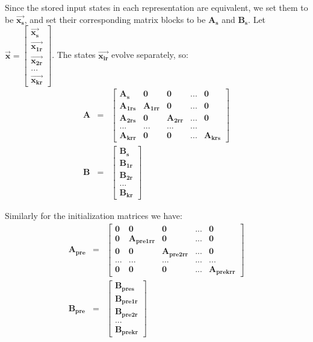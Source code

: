     Since the stored input states in each representation are
equivalent, we set them to be $\vec{\mathbf{x_s}}$, and set their
corresponding matrix blocks to be $\mathbf{A_s}$ and
$\mathbf{B_s}$. Let $\vec{\mathbf{x}} = \left [ \begin{array} {c}
\vec{\mathbf{x_{s}}} \\ \vec{\mathbf{x_{1r}}} \\
\vec{\mathbf{x_{2r}}} \\ ... \\ \vec{\mathbf{x_{kr}}} \end{array}
\right ]$. The states $\vec{\mathbf{x_{ir}}}$ evolve separately,
so:
\begin{eqnarray*}
\mathbf{A} & = & \left [ \begin{array} {ccccc} \mathbf{A_s} &
\mathbf{0} & \mathbf{0} & ... & \mathbf{0} \\ \mathbf{A_{1rs}} &
\mathbf{A_{1rr}} & \mathbf{0} & ... & \mathbf{0} \\
\mathbf{A_{2rs}} & \mathbf{0} & \mathbf{A_{2rr}} & ... & \mathbf{0}
\\ ... & ... & ... & ... \\ \mathbf{A_{krr}} & \mathbf{0} &
\mathbf{0} & ... & \mathbf{A_{krs}} \end{array} \right ] \\
\mathbf{B} & = & \left [ \begin{array} {c} \mathbf{B_s} \\ \mathbf{B_{1r}} \\
\mathbf{B_{2r}} \\ ... \\ \mathbf{B_{kr}} \end{array} \right ]
\end{eqnarray*}

    Similarly for the initialization matrices we have:
\begin{eqnarray*}
\mathbf{A_{pre}} & = & \left [ \begin{array} {ccccc} \mathbf{0} &
\mathbf{0} & \mathbf{0} & ... & \mathbf{0} \\
\mathbf{0} & \mathbf{A_{pre1rr}} & \mathbf{0} & ... & \mathbf{0} \\
\mathbf{0} & \mathbf{0} & \mathbf{A_{pre2rr}} & ... & \mathbf{0} \\
... & ... & ... & ... & ... \\ \mathbf{0} & \mathbf{0} &
\mathbf{0} & ... & \mathbf{A_{prekrr}} \end{array} \right ] \\
\mathbf{B_{pre}} & = & \left [ \begin{array} {c} \mathbf{B_{pres}} \\
\mathbf{B_{pre1r}} \\ \mathbf{B_{pre2r}} \\ ... \\
\mathbf{B_{prekr}} \end{array} \right ]
\end{eqnarray*}

